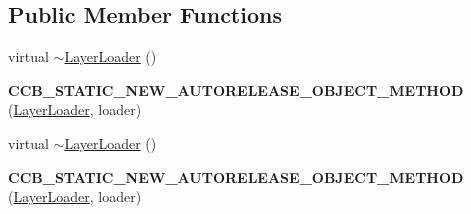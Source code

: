 \subsection*{Public Member Functions}
\begin{DoxyCompactItemize}
\item 
virtual \hyperlink{classcocosbuilder_1_1LayerLoader_abc4fcc903ab66147e64425ef18bdeefa}{$\sim$\+Layer\+Loader} ()
\item 
\mbox{\label{classcocosbuilder_1_1LayerLoader_a7cfbceb5a32ccf48a2f967f327b3013b}} 
{\bfseries C\+C\+B\+\_\+\+S\+T\+A\+T\+I\+C\+\_\+\+N\+E\+W\+\_\+\+A\+U\+T\+O\+R\+E\+L\+E\+A\+S\+E\+\_\+\+O\+B\+J\+E\+C\+T\+\_\+\+M\+E\+T\+H\+OD} (\hyperlink{classcocosbuilder_1_1LayerLoader}{Layer\+Loader}, loader)
\item 
virtual \hyperlink{classcocosbuilder_1_1LayerLoader_abc4fcc903ab66147e64425ef18bdeefa}{$\sim$\+Layer\+Loader} ()
\item 
\mbox{\label{classcocosbuilder_1_1LayerLoader_a7cfbceb5a32ccf48a2f967f327b3013b}} 
{\bfseries C\+C\+B\+\_\+\+S\+T\+A\+T\+I\+C\+\_\+\+N\+E\+W\+\_\+\+A\+U\+T\+O\+R\+E\+L\+E\+A\+S\+E\+\_\+\+O\+B\+J\+E\+C\+T\+\_\+\+M\+E\+T\+H\+OD} (\hyperlink{classcocosbuilder_1_1LayerLoader}{Layer\+Loader}, loader)
\end{DoxyCompactItemize}
